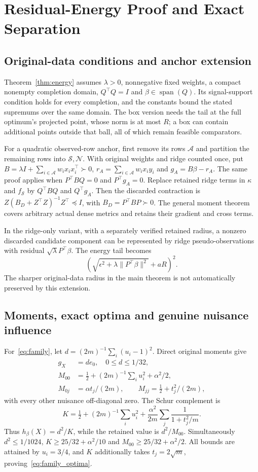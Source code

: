 

\section{Residual-Energy Proof and Exact Separation}\label{app:energy}

\subsection{Original-data conditions and anchor extension}
Theorem~\ref{thm:energy} assumes $\lambda>0$, nonnegative fixed weights, a compact nonempty completion domain, $Q^\top Q=I$ and $\beta\in\operatorname{span}(Q)$. Its signal-support condition holds for every completion, and the constants bound the stated supremums over the same domain. The box version needs the tail at the full optimum's projected point, whose norm is at most $R$; a box can contain additional points outside that ball, all of which remain feasible comparators.

For a quadratic observed-row anchor, first remove its rows $\mathcal A$ and partition the remaining rows into $\mathcal S,\mathcal N$. With original weights and ridge counted once, put $B=\lambda I+\sum_{i\in\mathcal A}w_ix_ix_i^\top\succ0$, $r_A=\sum_{i\in\mathcal A}w_ix_iy_i$ and $g_A=B\beta-r_A$. The same proof applies when $P^\top BQ=0$ and $P^\top g_A=0$. Replace retained ridge terms in $\kappa$ and $f_{\mathcal S}$ by $Q^\top BQ$ and $Q^\top g_A$. Then the discarded contraction is $Z(B_D+Z^\top Z)^{-1}Z^\top\preceq I$, with $B_D=P^\top BP\succ0$. The general moment theorem covers arbitrary actual dense metrics and retains their gradient and cross terms.

In the ridge-only variant, with a separately verified retained radius, a nonzero discarded candidate component can be represented by ridge pseudo-observations with residual $\sqrt\lambda P^\top\beta$. The energy tail becomes
\[
 \left(\sqrt{\epsilon^2+\lambda\|P^\top\beta\|^2}+aR\right)^2.
\]
The sharper original-data radius in the main theorem is not automatically preserved by this extension.

\subsection{Moments, exact optima and genuine nuisance influence}
For~\eqref{eq:family}, let $d=(2m)^{-1}\sum_i(u_i-1)^2$. Direct original moments give
\begin{align*}
 g_X&=de_0,\quad 0\leq d\leq1/32,\\
 M_{00}&=\tfrac12+(2m)^{-1}\sum_i u_i^2+\alpha^2/2,\\
 M_{0j}&=\alpha t_j/(2m),\qquad M_{jj}=\tfrac12+t_j^2/(2m),
\end{align*}
with every other nuisance off-diagonal zero. The Schur complement is
\[
 K=\tfrac12+(2m)^{-1}\sum_i u_i^2
       +\frac{\alpha^2}{2m}\sum_j\frac1{1+t_j^2/m}.
\]
Thus $h_\beta(X)=d^2/K$, while the retained value is $d^2/M_{00}$. Simultaneously $d^2\leq1/1024$, $K\geq25/32+\alpha^2/10$ and $M_{00}\geq25/32+\alpha^2/2$. All bounds are attained by $u_i=3/4$, and $K$ additionally takes $t_j=2\sqrt m$, proving~\eqref{eq:family_optima}.


